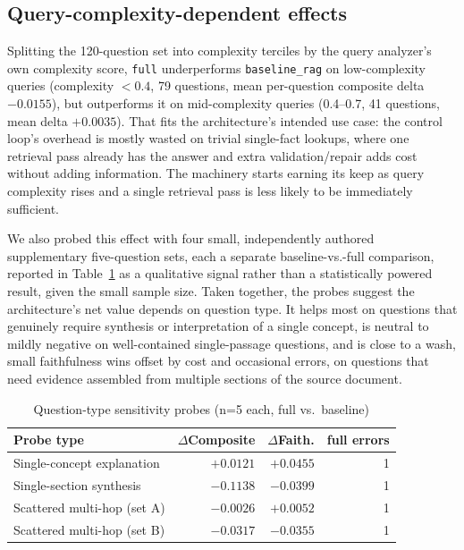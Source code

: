\documentclass[conference]{IEEEtran}
\begin{document}
\subsection{Query-complexity-dependent effects}

Splitting the 120-question set into complexity terciles by the query analyzer's own
complexity score, \texttt{full} underperforms \texttt{baseline\_rag} on low-complexity
queries (complexity $<0.4$, 79 questions, mean per-question composite delta
$-0.0155$), but outperforms it on mid-complexity queries (0.4--0.7, 41 questions, mean
delta $+0.0035$). That fits the architecture's intended use case: the control loop's
overhead is mostly wasted on trivial single-fact lookups, where one retrieval pass
already has the answer and extra validation/repair adds cost without adding
information. The machinery starts earning its keep as query complexity rises and a
single retrieval pass is less likely to be immediately sufficient.

We also probed this effect with four small, independently authored supplementary
five-question sets, each a separate baseline-vs.-full comparison, reported in
Table~\ref{tab:probes} as a qualitative signal rather than a statistically powered
result, given the small sample size. Taken together, the probes suggest the
architecture's net value depends on question type. It helps most on questions that
genuinely require synthesis or interpretation of a single concept, is neutral to mildly
negative on well-contained single-passage questions, and is close to a wash, small
faithfulness wins offset by cost and occasional errors, on questions that need evidence
assembled from multiple sections of the source document.

\begin{table}[t]
\centering
\caption{Question-type sensitivity probes (n=5 each, full vs.\ baseline)}
\label{tab:probes}
\begin{tabular}{lrrr}
\toprule
Probe type & $\Delta$Composite & $\Delta$Faith. & full errors \\
\midrule
Single-concept explanation & $+0.0121$ & $+0.0455$ & 1 \\
Single-section synthesis & $-0.1138$ & $-0.0399$ & 1 \\
Scattered multi-hop (set A) & $-0.0026$ & $+0.0052$ & 1 \\
Scattered multi-hop (set B) & $-0.0317$ & $-0.0355$ & 1 \\
\bottomrule
\end{tabular}
\end{table}
\end{document}
